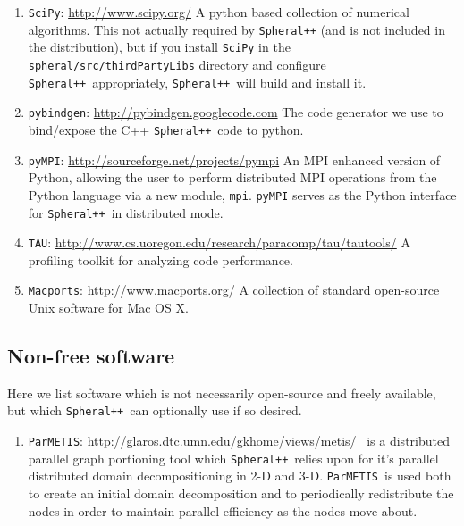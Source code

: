 \documentclass{article}
\newcommand{\Spheral}{{\tt Spheral++}}
\begin{document}
\begin{enumerate}
\item \verb+SciPy+: \url{http://www.scipy.org/} \newline A python based
  collection of numerical algorithms.  This not actually required by \Spheral
  (and is not included in the distribution), but if you install {\tt SciPy} in
  the \verb+spheral/src/thirdPartyLibs+ directory and configure
  \Spheral\ appropriately, \Spheral\ will build and install it.

\item \verb+pybindgen+: \url{http://pybindgen.googlecode.com} \newline
  The code generator we use to bind/expose the C++ \Spheral\ code to python.

\item\verb+pyMPI+: \url{http://sourceforge.net/projects/pympi} \newline
An MPI enhanced version of Python, allowing the user to perform distributed MPI
operations from the Python language via a new module, \verb+mpi+.  \verb+pyMPI+
serves as the Python interface for \Spheral\ in distributed mode.

\item\verb+TAU+: \url{http://www.cs.uoregon.edu/research/paracomp/tau/tautools/}
\newline
A profiling toolkit for analyzing code performance.

\item\verb+Macports+: \url{http://www.macports.org/} \newline
\label{Macports.sec}
A collection of standard open-source Unix software for Mac OS X.

\end{enumerate}

\subsection{Non-free software}
\label{nonfree.sec}
Here we list software which is not necessarily open-source and freely available,
but which \Spheral\ can optionally use if so desired.
\newcommand{\Parmetis}{{\tt ParMETIS}}
\begin{enumerate}
\item \Parmetis: \label{parmetis.item}
  \url{http://glaros.dtc.umn.edu/gkhome/views/metis/} \newline \Parmetis\ is a
  distributed parallel graph portioning tool which \Spheral\ relies upon for
  it's parallel distributed domain decompositioning in 2-D and 3-D.
  \Parmetis\ is used both to create an initial domain decomposition and to
  periodically redistribute the nodes in order to maintain parallel efficiency
  as the nodes move about.
\end{enumerate}
\end{document}
